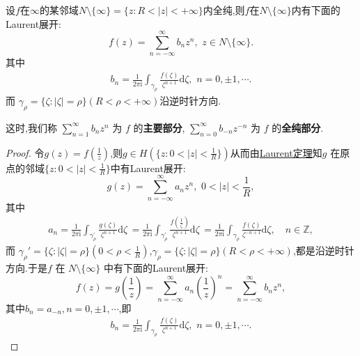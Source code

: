 \documentclass[../../main.tex]{subfiles}%
\begin{document}
\begin{theorem}
设$f$在$\infty$的某邻域$N\setminus \{\infty\}=\{z:R<|z|<+\infty\}$内全纯,则\( f \)在$N\setminus \{\infty\}$内有下面的Laurent展开:
\[
f(z) = \sum_{n = -\infty}^{\infty} b_n z^n,\,\,z\in N\setminus \{\infty\}.
\]
其中
\begin{align*}
b_n=\frac{1}{2\pi \mathrm{i}}\int_{\gamma _{\rho}}{\frac{f(\zeta )}{\zeta^{n+1}}\mathrm{d}\zeta},\,\,n=0,\pm 1,\cdots .
\end{align*}
而 \( \gamma_{\rho} = \{ \zeta: |\zeta| = \rho \} \)\( (R < \rho <+\infty )\)沿逆时针方向.

这时,我们称 \( \sum_{n = 1}^{\infty} b_n z^n \) 为 \( f \) 的\textbf{主要部分}, \( \sum_{n = 0}^{\infty} b_{-n} z^{-n} \) 为 \( f \) 的\textbf{全纯部分}.
\end{theorem}
\begin{proof}
令$g\left( z \right) =f\left( \frac{1}{z} \right) $,则$g\in H(\{z:0<|z|<\frac{1}{R}\})$从而由\hyperref[theorem:定理5.1.2]{Laurent定理}知\( g \) 在原点的邻域$\{z:0<|z|<\frac{1}{R}\}$中有Laurent展开:
\[
g(z) = \sum_{n = -\infty}^{\infty} a_n z^n, \,\, 0 < |z| < \frac{1}{R},
\]
其中
\begin{align*}
a_n=\frac{1}{2\pi \mathrm{i}}\int_{\gamma _{\rho}^{\prime}}{\frac{g(\zeta )}{\zeta ^{n+1}}\mathrm{d}\zeta \,}=\frac{1}{2\pi \mathrm{i}}\int_{\gamma _{\rho}^{\prime}}{\frac{f(\frac{1}{\zeta})}{\zeta ^{n+1}}\mathrm{d}\zeta \,}=\frac{1}{2\pi \mathrm{i}}\int_{\gamma _{\rho}}{\frac{f(\zeta )}{\zeta ^{-n+1}}\mathrm{d}\zeta},\quad n\in \mathbb{Z} ,
\end{align*}
而 \( \gamma_{\rho}' = \{ \zeta: |\zeta| = \rho \} \)\(( 0 < \rho < \frac{1}{R}) \),$\gamma _{\rho}=\{\zeta :|\zeta |=\rho \}\left( R<\rho <+\infty \right) $,都是沿逆时针方向.于是\( f \) 在 \( N\setminus \{\infty\}\) 中有下面的Laurent展开:
\[
f(z) =g\left( \frac{1}{z} \right) =\sum_{n = -\infty}^{\infty} a_n \left(\frac{1}{z}\right)^n= \sum_{n = -\infty}^{\infty} b_n z^n,
\]
其中\( b_n = a_{-n}, n = 0, \pm 1, \cdots \),即
\begin{align*}
b_n=\frac{1}{2\pi \mathrm{i}}\int_{\gamma _{\rho}}{\frac{f(\zeta )}{\zeta^{n+1}}\mathrm{d}\zeta},\,\,n=0,\pm 1,\cdots .
\end{align*}
\end{proof}
\end{document}
